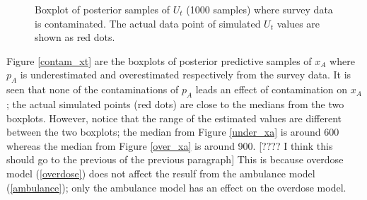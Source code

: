 \documentclass[]{article}
\begin{document}
\begin{figure}[htb]
	\centering
	\caption[two early result box plots:ut]{Boxplot of posterior samples of $U_t$ (1000 samples) where survey data is contaminated.  The actual data point of simulated $U_t$ values are shown as red dots.}
	\label{contam_ut}
\end{figure}

Figure \ref{contam_xt}  are the boxplots of posterior predictive samples of $x_A$ where $p_A$ is underestimated and overestimated respectively from the survey data. It is seen that none of the contaminations of $p_A$ leads an effect of contamination on $x_A$; the actual simulated points (red dots) are close to the medians from the two boxplots. However, notice that the range of the estimated values are different between the two boxplots; the median from Figure \ref{under_xa} is around 600 whereas the median from Figure \ref{over_xa} is around 900. [???? I think this should go to the previous of the previous paragraph] This is because overdose model (\ref{overdose}) does not affect the resulf from the ambulance model (\ref{ambulance}); only the ambulance model has an effect on the overdose model.
\end{document}
